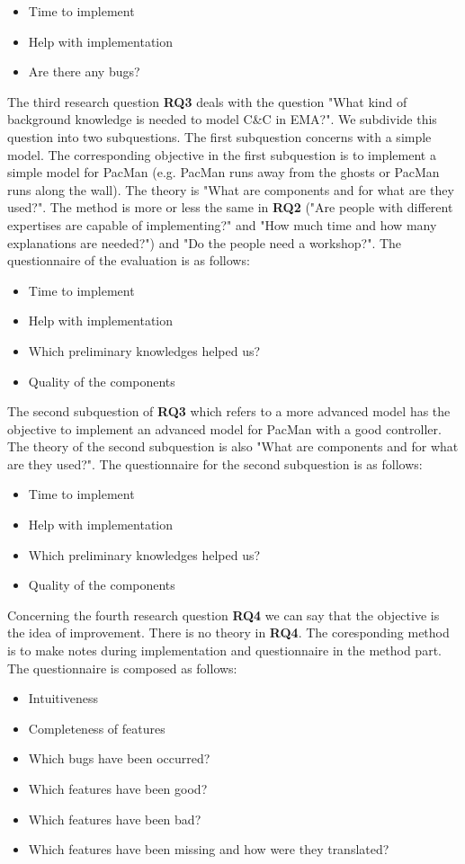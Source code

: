 \begin{itemize}
	\item Time to implement
	\item Help with implementation
	\item Are there any bugs?
\end{itemize}
The third research question \textbf{RQ3} deals with the question "What kind of background knowledge is needed to model C\&C in EMA?". We subdivide this question into two subquestions. The first subquestion concerns with a simple model. The corresponding objective in the first subquestion is to implement a simple model for PacMan (e.g. PacMan runs away from the ghosts or PacMan runs along the wall). The theory is "What are components and for what are they used?". The method is more or less the same in \textbf{RQ2} ("Are people with different expertises are capable of implementing?" and "How much time and how many explanations are needed?") and "Do the people need a workshop?". The questionnaire of the evaluation is as follows:
\begin{itemize}
	\item Time to implement
	\item Help with implementation
	\item Which preliminary knowledges helped us?
	\item Quality of the components
\end{itemize}
The second subquestion of \textbf{RQ3} which refers to a more advanced model has the objective to implement an advanced model for PacMan with a good controller. The theory of the second subquestion is also "What are components and for what are they used?". The questionnaire for the second subquestion is as follows:
\begin{itemize}
	\item Time to implement
	\item Help with implementation
	\item Which preliminary knowledges helped us?
	\item Quality of the components
\end{itemize}
Concerning the fourth research question \textbf{RQ4} we can say that the objective is the idea of improvement. There is no theory in \textbf{RQ4}. The coresponding method is to make notes during implementation and questionnaire in the method part. The questionnaire is composed as follows:
\begin{itemize}
	\item Intuitiveness
	\item Completeness of features
	\item Which bugs have been occurred?
	\item Which features have been good?
	\item Which features have been bad?
	\item Which features have been missing and how were they translated?
\end{itemize}